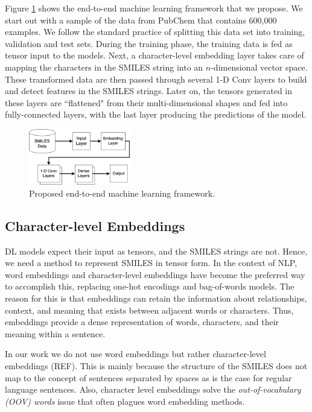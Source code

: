     
Figure \ref{fig:ml-framework} shows the end-to-end machine learning framework that we propose. We start out with a sample of the data from PubChem that contains 600,000 examples. We follow the standard practice of splitting this data set into training, validation and test sets. During the training phase, the training data is fed as tensor input to the models. Next, a character-level embedding layer takes care of mapping the characters in the SMILES string into an $n$-dimensional vector space. These transformed data are then passed through several 1-D Conv layers to build and detect features in the SMILES strings. Later on, the tensors generated in these layers are ``flattened" from their multi-dimensional shapes and fed into fully-connected layers, with the last layer producing the predictions of the model.
    \begin{figure}[htbp]
        \centering
        \includegraphics[width=0.4\textwidth]{figures/1DConvArch.png}
        \caption{Proposed end-to-end machine learning framework.}
        \label{fig:ml-framework}
    \end{figure}
\subsection{Character-level Embeddings \label{embeddings}}
DL models expect their input as tensors, and the SMILES strings are not. Hence, we need a method to represent SMILES in tensor form. In the context of NLP, word embeddings and character-level embeddings have become the preferred way to accomplish this, replacing one-hot encodings and bag-of-words models. The reason for this  is that embeddings can retain the information about relationships, context, and meaning that exists between adjacent words or characters. Thus, embeddings provide a dense representation of words, characters, and their
meaning within a sentence. 

In our work we do not use word embeddings but rather character-level embeddings (REF). This is mainly because the structure of the SMILES does not map to the concept of sentences separated by spaces as is the case for regular language sentences. Also, character level embeddings solve the {\em out-of-vocabulary (OOV) words} issue that often plagues word embedding methods.


